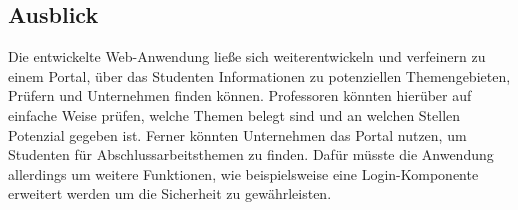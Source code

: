 \subsection{Ausblick}
Die entwickelte Web-Anwendung lie\ss{}e sich weiterentwickeln und verfeinern zu einem Portal, \"uber das Studenten Informationen zu potenziellen Themengebieten, Pr\"ufern und Unternehmen finden k\"onnen. Professoren k\"onnten hier\"uber auf einfache Weise pr\"ufen, welche Themen belegt sind und an welchen Stellen Potenzial gegeben ist. Ferner k\"onnten Unternehmen das Portal nutzen, um Studenten f\"ur Abschlussarbeitsthemen zu finden. Daf\"ur m\"usste die Anwendung allerdings um weitere Funktionen, wie beispielsweise eine Login-Komponente erweitert werden um die Sicherheit zu gew\"ahrleisten.  